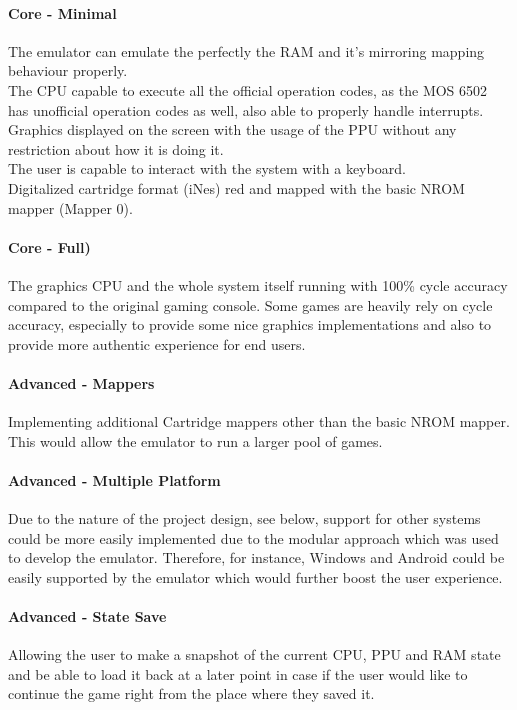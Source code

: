 \documentclass[]{report}
\begin{document}
\paragraph{Core - Minimal}
The emulator can emulate the perfectly the RAM and it's mirroring mapping behaviour properly. 
\\
The CPU capable to execute all the official operation codes, as the MOS 6502 has unofficial operation codes as well, also able to properly handle interrupts. 
\\ 
Graphics displayed on the screen with the usage of the PPU without any restriction about how it is doing it.
\\ 
The user is capable to interact with the system with a keyboard.
\\ 
Digitalized cartridge format (iNes) red and mapped with the basic NROM mapper (Mapper 0).
\paragraph{Core - Full)}
The graphics CPU and the whole system itself running with 100\% cycle accuracy compared to the original gaming console.
Some games are heavily rely on cycle accuracy, especially to provide some nice graphics implementations and also to provide more authentic experience for end users.

\paragraph{Advanced - Mappers}
Implementing additional Cartridge mappers other than the basic NROM mapper\cite{MPPR}. This would allow the emulator to run a larger pool of games.

\paragraph{Advanced - Multiple Platform}
Due to the nature of the project design, see below, support for other systems could be more easily implemented due to the modular approach which was used to develop the emulator. Therefore, for instance, Windows and Android could be easily supported by the emulator which would further boost the user experience.

\paragraph{Advanced - State Save}
Allowing the user to make a snapshot of the current CPU, PPU and RAM state and be able to load it back at a later point in case if the user would like to continue the game right from the place where they saved it.
\end{document}
